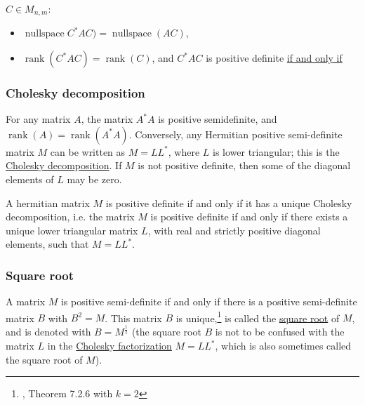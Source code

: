 {{{{{{{{{{{{{{{{%
\(C \in M_{n,m}\):
%
\begin{itemize}
%
\item
\(\operatorname{nullspace}C^* AC) = \operatorname{nullspace}(AC)\),
\item
\(\operatorname{rank}(C^* AC) = \operatorname{rank}(C)\), and
\(C^* AC\) is positive definite \href{if_and_only_if}{if and only if}
\end{itemize}

\hypertarget{cholesky-decomposition}{%
\subsubsection{Cholesky decomposition}\label{cholesky-decomposition}}

For any matrix \(A\), the matrix \(A^* A\) is positive semidefinite, and
\(\operatorname{rank}(A) = \operatorname{rank}(A^* A)\). Conversely, any
Hermitian positive semi-definite matrix \(M\) can be written as
\(M = LL^*\), where \(L\) is lower triangular; this is the
\href{Cholesky_decomposition}{Cholesky decomposition}. If \(M\) is not
positive definite, then some of the diagonal elements of \(L\) may be
zero.

A hermitian matrix \(M\) is positive definite if and only if it has a
unique Cholesky decomposition, i.e. the matrix \(M\) is positive
definite if and only if there exists a unique lower triangular matrix
\(L\), with real and strictly positive diagonal elements, such that
\(M = LL^*\).

\hypertarget{square-root}{%
\subsubsection{Square root}\label{square-root}}

A matrix \(M\) is positive semi-definite if and only if there is a
positive semi-definite matrix \(B\) with \(B^2 = M\). This matrix \(B\)
is unique,\footnote{, Theorem 7.2.6 with \(k = 2\)} is called the
\href{square_root_of_a_matrix}{square root} of \(M\), and is denoted
with \(B = M^\frac{1}{2}\) (the square root \(B\) is not to be confused
with the matrix \(L\) in the \href{Cholesky_factorization}{Cholesky
factorization} \(M = LL^*\), which is also sometimes called the square
root of \(M\)).

}}}}}}}}}}}}}}}}
